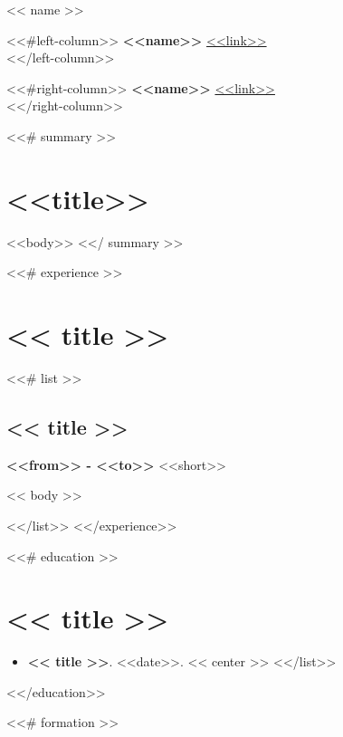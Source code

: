 \documentclass[<<fontsize>>]{article}
\providecommand{\tightlist}{%
  \setlength{\itemsep}{0pt}\setlength{\parskip}{0pt}}
\begin{document}
{\huge << name >>}

\bigskip

\begin{minipage}[t]{0.495\textwidth}
  <<#left-column>>
  \textbf{<<name>>} \url{<<link>>} \\
  <</left-column>>
\end{minipage} %
\begin{minipage}[t]{0.495\textwidth}
  <<#right-column>>
  \textbf{<<name>>} \url{<<link>>} \\
  <</right-column>>
\end{minipage}



<<# summary >>
\section{<<title>>}
<<body>>
<</ summary >>


<<# experience >>
\section{<< title >>}

<<# list >>
\subsection{<< title >>}

\textbf{<<from>> - <<to>>} <<short>>

<< body >>

<</list>>
<</experience>>


<<# education >>
\section{<< title >>}

\begin{itemize}
  \tightlist
  <<# list >>
    \item \textbf{<< title >>}. <<date>>. << center >>
  <</list>>
\end{itemize}
<</education>>


<<# formation >>
\end{document}
